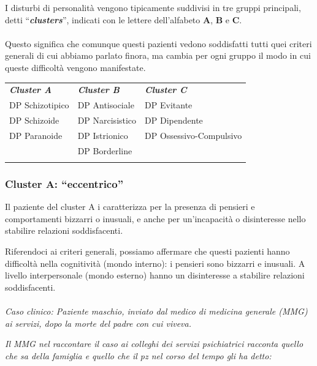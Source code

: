 I disturbi di personalità vengono tipicamente suddivisi in tre gruppi
principali, detti ``\textbf{\emph{clusters}}'', indicati con le lettere
dell'alfabeto \textbf{A}, \textbf{B} e \textbf{C}.
\\\\
Questo significa che comunque questi pazienti vedono soddisfatti tutti
quei criteri generali di cui abbiamo parlato finora, ma cambia per ogni
gruppo il modo in cui queste difficoltà vengono manifestate.

\begin{table}
\begin{tabular}{p{}p{}p{}}
\hline\noalign{\smallskip}
\textbf{\emph{Cluster A}} & \textbf{\emph{Cluster B}} & \textbf{\emph{Cluster C}}  \\
\noalign{\smallskip}\svhline\noalign{\smallskip}

DP Schizotipico &	DP Antisociale	& DP Evitante \\
DP Schizoide &	DP Narcisistico & DP Dipendente \\
DP Paranoide &	DP Istrionico &	DP Ossessivo-Compulsivo \\
 & DP Borderline & \\

\noalign{\smallskip}\hline\noalign{\smallskip}
\end{tabular}
\end{table}


\subsubsection{Cluster A: ``eccentrico''}

Il paziente del cluster A i caratterizza per la presenza di pensieri e
comportamenti bizzarri o inusuali, e anche per un'incapacità o
disinteresse nello stabilire relazioni soddisfacenti.

Riferendoci ai criteri generali, possiamo affermare che questi pazienti
hanno difficoltà nella cognitività (mondo interno): i pensieri sono
bizzarri e inusuali. A livello interpersonale (mondo esterno) hanno un
disinteresse a stabilire relazioni soddisfacenti.
\\\\
\emph{Caso clinico: Paziente maschio, inviato dal medico di medicina
generale (MMG) ai servizi, dopo la morte del padre con cui viveva.}

\emph{Il MMG nel raccontare il caso ai colleghi dei servizi psichiatrici
racconta quello che sa della famiglia e quello che il pz nel corso del
tempo gli ha detto:}

